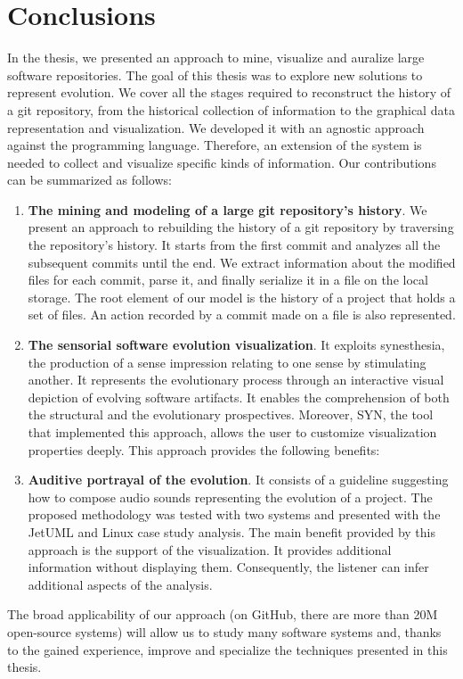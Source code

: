 \documentclass[11pt,twoside,english,singlespacing,headsepline,consistentlayout]{auxiliary/si-msc-thesis}
\begin{document}
\section*{Conclusions}

In the thesis, we presented an approach to mine, visualize and auralize large software repositories. The goal of this thesis was to explore new solutions to represent evolution. We cover all the stages required to reconstruct the history of a git repository, from the historical collection of information to the graphical data representation and visualization. We developed it with an agnostic approach against the programming language. Therefore, an extension of the system is needed to collect and visualize specific kinds of information. Our contributions can be summarized as follows:
\begin{enumerate}
    \item \textbf{The mining and modeling of a large git repository's history}. We present an approach to rebuilding the history of a git repository by traversing the repository's history. It starts from the first commit and analyzes all the subsequent commits until the end.
    We extract information about the modified files for each commit, parse it, and finally serialize it in a file on the local storage. The root element of our model is the history of a project that holds a set of files. An action recorded by a commit made on a file is also represented.
    \item \textbf{The sensorial software evolution visualization}. It exploits synesthesia, the production of a sense impression relating to one sense by stimulating another. It represents the evolutionary process through an interactive visual depiction of evolving software artifacts. It enables the comprehension of both the structural and the evolutionary prospectives. Moreover, SYN, the tool that implemented this approach, allows the user to customize visualization properties deeply. This approach provides the following benefits:
    \item \textbf{Auditive portrayal of the evolution}. It consists of a guideline suggesting how to compose audio sounds representing the evolution of a project. The proposed methodology was tested with two systems and presented with the JetUML and Linux case study analysis. The main benefit provided by this approach is the support of the visualization. It provides additional information without displaying them. Consequently, the listener can infer additional aspects of the analysis.
\end{enumerate}  

The broad applicability of our approach  (on GitHub, there are more than 20M open-source systems) will allow us to study many software systems and, thanks to the gained experience, improve and specialize the techniques presented in this thesis.   

\newpage


\end{document}
